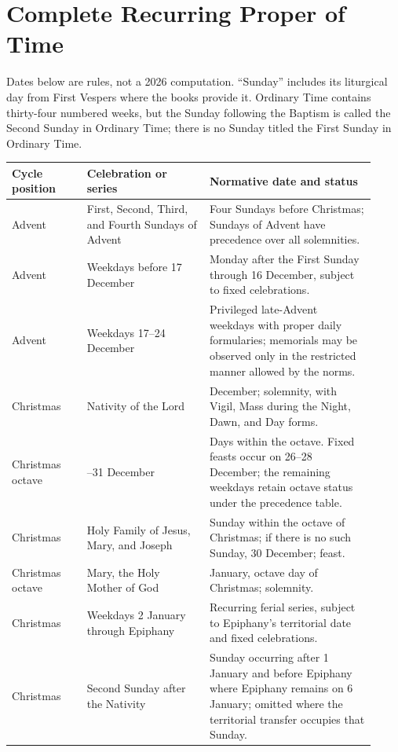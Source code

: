 \section{Complete Recurring Proper of Time}

Dates below are rules, not a 2026 computation. “Sunday” includes its liturgical day from First Vespers where the books provide it. Ordinary Time contains thirty-four numbered weeks, but the Sunday following the Baptism is called the Second Sunday in Ordinary Time; there is no Sunday titled the First Sunday in Ordinary Time.

\begin{longtable}{>{\raggedright\arraybackslash}p{0.19\linewidth}>{\raggedright\arraybackslash}p{0.31\linewidth}>{\raggedright\arraybackslash}p{0.42\linewidth}}
\toprule
Cycle position & Celebration or series & Normative date and status\\
\midrule
\endhead
Advent & First, Second, Third, and Fourth Sundays of Advent & Four Sundays before Christmas; Sundays of Advent have precedence over all solemnities.\\
Advent & Weekdays before 17 December & Monday after the First Sunday through 16 December, subject to fixed celebrations.\\
Advent & Weekdays 17--24 December & Privileged late-Advent weekdays with proper daily formularies; memorials may be observed only in the restricted manner allowed by the norms.\\
Christmas & Nativity of the Lord & 25 December; solemnity, with Vigil, Mass during the Night, Dawn, and Day forms.\\
Christmas octave & 26--31 December & Days within the octave. Fixed feasts occur on 26--28 December; the remaining weekdays retain octave status under the precedence table.\\
Christmas & Holy Family of Jesus, Mary, and Joseph & Sunday within the octave of Christmas; if there is no such Sunday, 30 December; feast.\\
Christmas octave & Mary, the Holy Mother of God & 1 January, octave day of Christmas; solemnity.\\
Christmas & Weekdays 2 January through Epiphany & Recurring ferial series, subject to Epiphany's territorial date and fixed celebrations.\\
Christmas & Second Sunday after the Nativity & Sunday occurring after 1 January and before Epiphany where Epiphany remains on 6 January; omitted where the territorial transfer occupies that Sunday.\\

\end{longtable}
